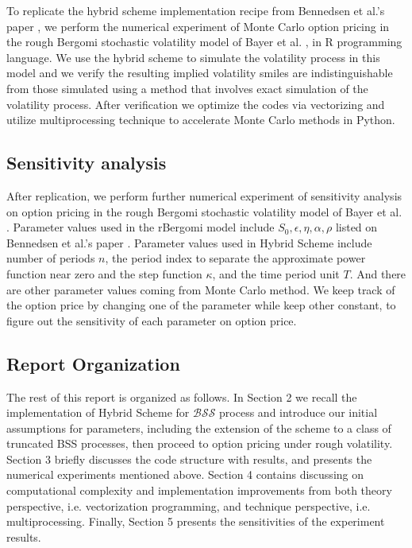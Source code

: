 \documentclass[12pt]{article}
\numberwithin{equation}{section}
\begin{document}
    	To replicate the hybrid scheme implementation recipe from Bennedsen et al.'s paper \cite{bennedsen2015hybrid}, we perform the numerical experiment of Monte Carlo option pricing in the rough Bergomi stochastic volatility model of Bayer et al. \cite{bayer2015pricing}, in R programming language. We use the hybrid scheme to simulate the volatility process in this model and we verify the resulting implied volatility smiles are indistinguishable from those simulated using a method that involves exact simulation of the volatility process. After verification we optimize the codes via vectorizing and utilize multiprocessing technique to accelerate Monte Carlo methods in Python.
    
    \subsection{Sensitivity analysis}
    
    	After replication, we perform further numerical experiment of sensitivity analysis on option pricing in the rough Bergomi stochastic volatility model of Bayer et al. \cite{bayer2015pricing}. Parameter values used in the rBergomi model include $S_0, \epsilon, \eta, \alpha, \rho$ listed on Bennedsen et al.'s paper \cite{bennedsen2015hybrid}. Parameter values used in Hybrid Scheme include number of periods $n$, the period index to separate the approximate power function near zero and the step function $\kappa$, and the time period unit $T$. And there are other parameter values coming from Monte Carlo method. We keep track of the option price by changing one of the parameter while keep other constant, to figure out the sensitivity of each parameter on option price.
    
    \subsection{Report Organization}
    
    	The rest of this report is organized as follows. In Section 2 we recall the implementation of Hybrid Scheme for $\mathcal{BSS}$ process and introduce our initial assumptions for parameters, including the extension of the scheme to a class of truncated BSS processes, then proceed to option pricing under rough volatility. Section 3 briefly discusses the code structure with results, and presents the numerical experiments mentioned above. Section 4 contains discussing on computational complexity and implementation improvements from both theory perspective, i.e. vectorization programming, and technique perspective, i.e. multiprocessing. Finally, Section 5 presents the sensitivities of the experiment results.
\end{document}

